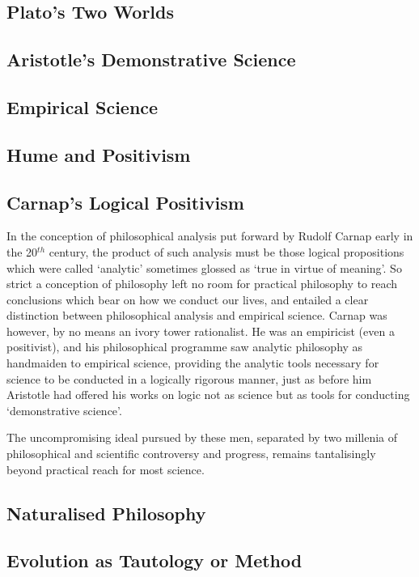 \documentclass[10pt,titlepage]{article}
\begin{document}
\subsection{Plato's Two Worlds}

\subsection{Aristotle's Demonstrative Science}

\subsection{Empirical Science}

\subsection{Hume and Positivism}

\subsection{Carnap's Logical Positivism}

In the conception of philosophical analysis put forward by Rudolf Carnap early in the 20$^{th}$ century, the product of such analysis must be those logical propositions which were called `analytic' sometimes glossed as `true in virtue of meaning'.
So strict a conception of philosophy left no room for practical philosophy to reach conclusions which bear on how we conduct our lives, and entailed a clear distinction between philosophical analysis and empirical science.
Carnap was however, by no means an ivory tower rationalist.
He was an empiricist (even a positivist), and his philosophical programme saw analytic philosophy as handmaiden to empirical science, providing the analytic tools necessary for science to be conducted in a logically rigorous manner, just as before him Aristotle had offered his works on logic not as science but as tools for conducting `demonstrative science'.

The uncompromising ideal pursued by these men, separated by two millenia of philosophical and scientific controversy and progress, remains tantalisingly beyond practical reach for most science.

\subsection{Naturalised Philosophy}


\subsection{Evolution as Tautology or Method}
\end{document}
